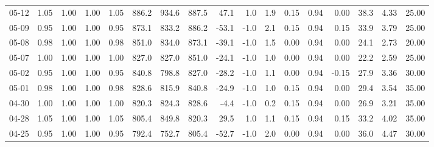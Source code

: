\begin{threeparttable}
{\begin{tabular}{lrrrrrrrrrrrrrrrr}
  05-12 &         1.05 &           1.00 &          1.00 &          1.05 & 886.2 & 934.6 & 887.5 &       47.1 &                      1.0 &                 1.9 &       0.15 &      0.94 &           0.00 &             38.3 &            4.33 &                  25.00 \\
  05-09 &         0.95 &           1.00 &          1.00 &          0.95 & 873.1 & 833.2 & 886.2 &      -53.1 &                     -1.0 &                 2.1 &       0.15 &      0.94 &           0.15 &             33.9 &            3.79 &                  25.00 \\
  05-08 &         0.98 &           1.00 &          1.00 &          0.98 & 851.0 & 834.0 & 873.1 &      -39.1 &                     -1.0 &                 1.5 &       0.00 &      0.94 &           0.00 &             24.1 &            2.73 &                  20.00 \\
  05-07 &         1.00 &           1.00 &          1.00 &          1.00 & 827.0 & 827.0 & 851.0 &      -24.1 &                     -1.0 &                 1.0 &       0.00 &      0.94 &           0.00 &             22.2 &            2.59 &                  25.00 \\
  05-02 &         0.95 &           1.00 &          1.00 &          0.95 & 840.8 & 798.8 & 827.0 &      -28.2 &                     -1.0 &                 1.1 &       0.00 &      0.94 &          -0.15 &             27.9 &            3.36 &                  30.00 \\
  05-01 &         0.98 &           1.00 &          1.00 &          0.98 & 828.6 & 815.9 & 840.8 &      -24.9 &                     -1.0 &                 1.0 &       0.15 &      0.94 &           0.00 &             29.4 &            3.54 &                  35.00 \\
  04-30 &         1.00 &           1.00 &          1.00 &          1.00 & 820.3 & 824.3 & 828.6 &       -4.4 &                     -1.0 &                 0.2 &       0.15 &      0.94 &           0.00 &             26.9 &            3.21 &                  35.00 \\
  04-28 &         1.05 &           1.00 &          1.00 &          1.05 & 805.4 & 849.8 & 820.3 &       29.5 &                      1.0 &                 1.1 &       0.15 &      0.94 &           0.15 &             33.2 &            4.02 &                  35.00 \\
  04-25 &         0.95 &           1.00 &          1.00 &          0.95 & 792.4 & 752.7 & 805.4 &      -52.7 &                     -1.0 &                 2.0 &       0.00 &      0.94 &           0.00 &             36.0 &            4.47 &                  30.00 \\

\end{tabular}}
\end{threeparttable}
